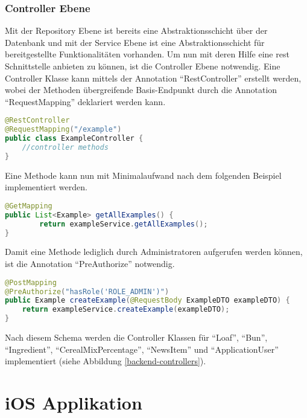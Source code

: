 \clearpage


\clearpage

\subsubsection{Controller Ebene}
Mit der Repository Ebene ist bereits eine Abstraktionsschicht über der Datenbank und mit der Service Ebene ist eine Abstraktionsschicht für bereitgestellte Funktionalitäten vorhanden. Um nun mit deren Hilfe eine \gls{rest} Schnittstelle anbieten zu können, ist die Controller Ebene notwendig.
Eine Controller Klasse kann mittels der Annotation \enquote{RestController} erstellt werden, wobei der Methoden übergreifende Basis-Endpunkt durch die Annotation \enquote{RequestMapping} deklariert werden kann.
\begin{lstlisting}[language=Java]
@RestController
@RequestMapping("/example")
public class ExampleController {
	//controller methods
}
\end{lstlisting}

Eine Methode kann nun mit Minimalaufwand nach dem folgenden Beispiel implementiert werden.
\begin{lstlisting}[language=Java]
@GetMapping
public List<Example> getAllExamples() {
        return exampleService.getAllExamples();
}
\end{lstlisting}

Damit eine Methode lediglich durch Administratoren aufgerufen werden können, ist die Annotation \enquote{PreAuthorize} notwendig.
\begin{lstlisting}[language=Java]
@PostMapping
@PreAuthorize("hasRole('ROLE_ADMIN')")
public Example createExample(@RequestBody ExampleDTO exampleDTO) {
	return exampleService.createExample(exampleDTO);
}
\end{lstlisting}

Nach diesem Schema werden die Controller Klassen für \enquote{Loaf}, \enquote{Bun}, \enquote{Ingredient}, \enquote{CerealMixPercentage}, \enquote{NewsItem} und \enquote{ApplicationUser} implementiert (siehe Abbildung \ref{backend-controllers}). 

\clearpage


\clearpage

\section{iOS Applikation}

